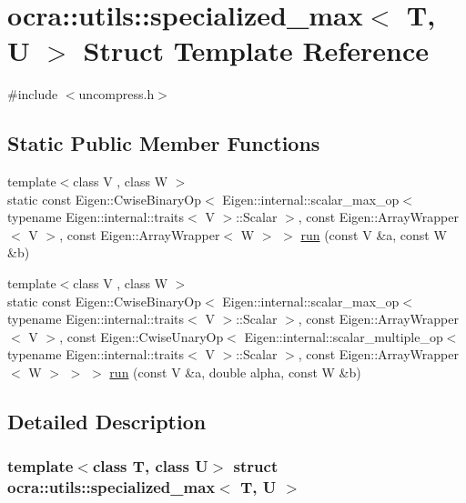 \hypertarget{structocra_1_1utils_1_1specialized__max}{}\section{ocra\+:\+:utils\+:\+:specialized\+\_\+max$<$ T, U $>$ Struct Template Reference}
\label{structocra_1_1utils_1_1specialized__max}


{\ttfamily \#include $<$uncompress.\+h$>$}

\subsection*{Static Public Member Functions}
\begin{DoxyCompactItemize}
\item 
{\footnotesize template$<$class V , class W $>$ }\\static const Eigen\+::\+Cwise\+Binary\+Op$<$ Eigen\+::internal\+::scalar\+\_\+max\+\_\+op$<$ typename Eigen\+::internal\+::traits$<$ V $>$\+::Scalar $>$, const Eigen\+::\+Array\+Wrapper$<$ V $>$, const Eigen\+::\+Array\+Wrapper$<$ W $>$ $>$ \hyperlink{structocra_1_1utils_1_1specialized__max_a597099a14b8243fa865f8f461ec655d9}{run} (const V \&a, const W \&b)
\item 
{\footnotesize template$<$class V , class W $>$ }\\static const Eigen\+::\+Cwise\+Binary\+Op$<$ Eigen\+::internal\+::scalar\+\_\+max\+\_\+op$<$ typename Eigen\+::internal\+::traits$<$ V $>$\+::Scalar $>$, const Eigen\+::\+Array\+Wrapper$<$ V $>$, const Eigen\+::\+Cwise\+Unary\+Op$<$ Eigen\+::internal\+::scalar\+\_\+multiple\+\_\+op$<$ typename Eigen\+::internal\+::traits$<$ V $>$\+::Scalar $>$, const Eigen\+::\+Array\+Wrapper$<$ W $>$ $>$ $>$ \hyperlink{structocra_1_1utils_1_1specialized__max_acd525475852219cc691bfafd273ed5fb}{run} (const V \&a, double alpha, const W \&b)
\end{DoxyCompactItemize}


\subsection{Detailed Description}
\subsubsection*{template$<$class T, class U$>$\newline
struct ocra\+::utils\+::specialized\+\_\+max$<$ T, U $>$}



